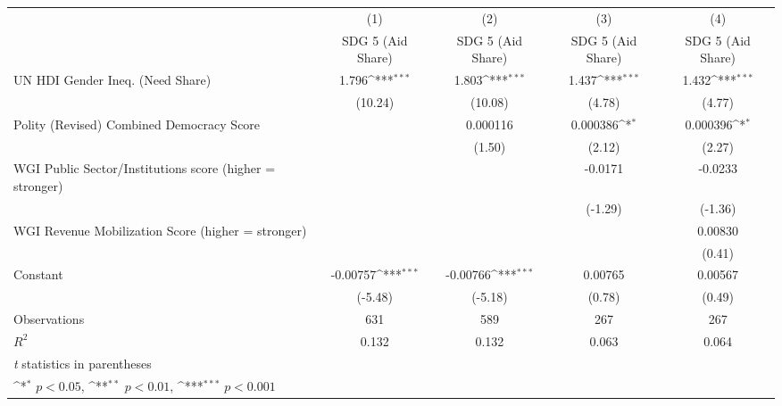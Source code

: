{
\def\sym#1{\ifmmode^{#1}\else\(^{#1}\)\fi}
\begin{tabular}{l*{4}{c}}
\hline\hline
                &\multicolumn{1}{c}{(1)}&\multicolumn{1}{c}{(2)}&\multicolumn{1}{c}{(3)}&\multicolumn{1}{c}{(4)}\\
                &\multicolumn{1}{c}{SDG 5 (Aid Share)}&\multicolumn{1}{c}{SDG 5 (Aid Share)}&\multicolumn{1}{c}{SDG 5 (Aid Share)}&\multicolumn{1}{c}{SDG 5 (Aid Share)}\\
\hline
UN HDI Gender Ineq. (Need Share)&    1.796\sym{***}&    1.803\sym{***}&    1.437\sym{***}&    1.432\sym{***}\\
                &  (10.24)         &  (10.08)         &   (4.78)         &   (4.77)         \\
[1em]
Polity (Revised) Combined Democracy Score&                  & 0.000116         & 0.000386\sym{*}  & 0.000396\sym{*}  \\
                &                  &   (1.50)         &   (2.12)         &   (2.27)         \\
[1em]
WGI Public Sector/Institutions score (higher = stronger)&                  &                  &  -0.0171         &  -0.0233         \\
                &                  &                  &  (-1.29)         &  (-1.36)         \\
[1em]
WGI Revenue Mobilization Score (higher = stronger)&                  &                  &                  &  0.00830         \\
                &                  &                  &                  &   (0.41)         \\
[1em]
Constant        & -0.00757\sym{***}& -0.00766\sym{***}&  0.00765         &  0.00567         \\
                &  (-5.48)         &  (-5.18)         &   (0.78)         &   (0.49)         \\
\hline
Observations    &      631         &      589         &      267         &      267         \\
\(R^{2}\)       &    0.132         &    0.132         &    0.063         &    0.064         \\
\hline\hline
\multicolumn{5}{l}{\footnotesize \textit{t} statistics in parentheses}\\
\multicolumn{5}{l}{\footnotesize \sym{*} \(p<0.05\), \sym{**} \(p<0.01\), \sym{***} \(p<0.001\)}\\
\end{tabular}
}
